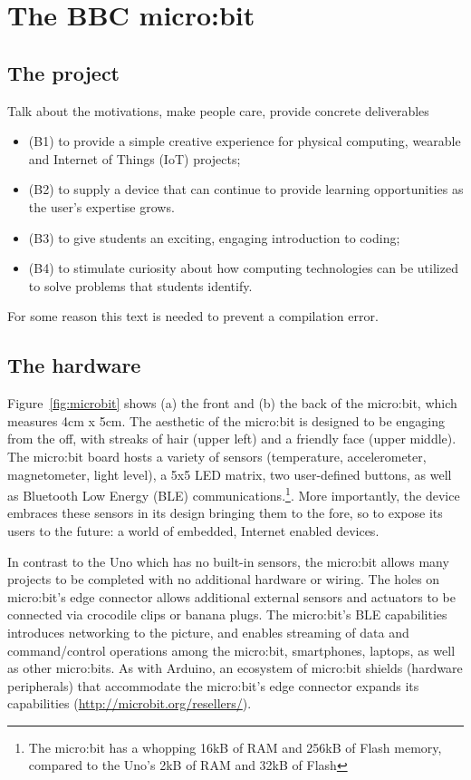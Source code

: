 \section{The BBC micro:bit}

\subsection{The project}

Talk about the motivations, make people care, provide concrete deliverables

\begin{itemize}
    \item (B1) to provide a simple creative experience for physical computing, wearable and Internet of Things (IoT) projects;
    \item (B2) to supply a device that can continue to provide learning opportunities as the user's expertise grows.
    \item (B3) to give students an exciting, engaging introduction to coding;
    \item (B4) to stimulate curiosity about how computing technologies can be utilized to solve problems that students identify.
\end{itemize}

For some reason this text is needed to prevent a compilation error.

\subsection{The hardware}

Figure~\ref{fig:microbit} shows (a) the front and (b) the back of the
micro:bit, which measures 4cm x 5cm. The aesthetic of the micro:bit is designed to be engaging from the off, with streaks of hair (upper left) and a friendly face (upper middle).
The micro:bit board hosts a variety of sensors (temperature, accelerometer, magnetometer,
light level), a 5x5 LED matrix, two user-defined buttons, as well as Bluetooth
Low Energy (BLE) communications.\footnote{The micro:bit has a whopping
16kB of RAM and 256kB of Flash memory, compared to the Uno's 2kB of
RAM and 32kB of Flash}. More importantly, the device embraces these sensors in its design bringing them to the fore, so to expose its users to the future: a world of embedded, Internet enabled devices.

In contrast to the Uno which has no built-in sensors, the micro:bit
allows many projects to be completed with no additional hardware or wiring.
The holes on micro:bit's edge connector allows additional external sensors and actuators to be connected via crocodile clips or banana plugs.
The micro:bit's BLE capabilities introduces networking to the
picture, and enables streaming of data and command/control operations among the micro:bit,
smartphones, laptops, as well as other micro:bits.
As with Arduino, an ecosystem of micro:bit shields
(hardware peripherals) that accommodate the micro:bit's edge
connector expands its capabilities (\url{http://microbit.org/resellers/}).

